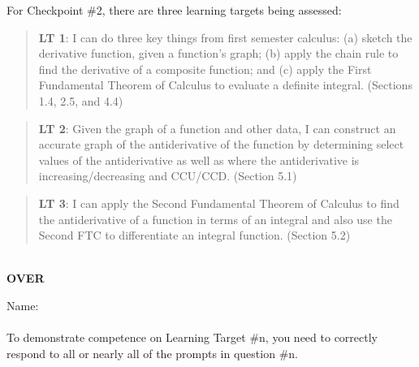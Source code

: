 \documentclass[11 pt]{article}
\begin{document}
 For Checkpoint \#2, there are three learning targets being assessed: 

\begin{quote}
{\bf LT 1}: I can do three key things from first semester calculus: (a) sketch the derivative function, given a function’s graph; (b) apply the chain rule to find the derivative of a composite function; and (c) apply the First Fundamental Theorem of Calculus to evaluate a definite integral. (Sections 1.4, 2.5, and 4.4)
\end{quote}

\begin{quote}
{\bf LT 2}: Given the graph of a function and other data, I can construct an accurate graph of the antiderivative of the function by determining select values of the antiderivative as well as where the antiderivative is increasing/decreasing and CCU/CCD.
(Section 5.1)
\end{quote}

\begin{quote}
{\bf LT 3}: I can apply the Second Fundamental Theorem of Calculus to find the antiderivative of a function in terms of an integral and also use the Second FTC to differentiate an integral function. (Section 5.2)
\end{quote}

\noindent \hrulefill \\

\vfill \hfill {\bf OVER} 

\pagebreak

\noindent Name: \\ \ \\

\noindent To demonstrate competence on Learning Target \#n, you need to correctly respond to all or nearly all of the prompts in question \#n.  
\end{document}

